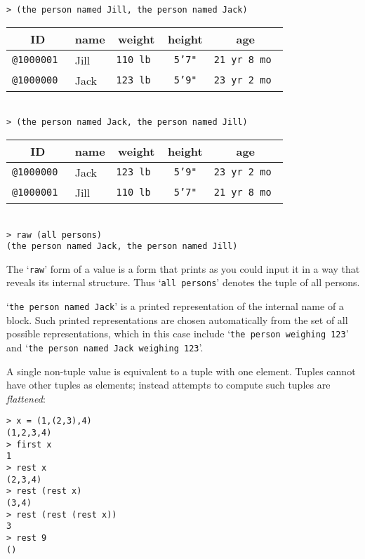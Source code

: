 \documentclass[12pt]{article}
\newcommand{\key}[1]{{\em #1}\index{#1}}
\newenvironment{indpar}[1][0.3in]%
	{\begin{list}{}%
		     {\setlength{\itemsep}{0in}%
		      \setlength{\topsep}{0in}%
		      \setlength{\parsep}{1ex}%
		      \setlength{\labelwidth}{#1}%
		      \setlength{\leftmargin}{#1}%
		      \addtolength{\leftmargin}{\labelsep}}%
	 \item}%
	{\end{list}}
\begin{document}
\begin{indpar}
\verb|> (the person named Jill, the person named Jack)| \\
\begin{tabular}{|r|l|r|r|r|}
\hline
\multicolumn{1}{|c}{\bf ID} &
\multicolumn{1}{|c}{\bf name} &
\multicolumn{1}{|c}{\bf weight} &
\multicolumn{1}{|c}{\bf height} &
\multicolumn{1}{|c|}{\bf age} \\
\hline
\tt @1000001 & Jill & \tt 110 lb & \tt 5'7" & \tt 21 yr 8 mo \\
\tt @1000000 & Jack & \tt 123 lb & \tt 5'9" & \tt 23 yr 2 mo \\
\hline
\end{tabular} \\
\verb|> (the person named Jack, the person named Jill)| \\
\begin{tabular}{|r|l|r|r|r|}
\hline
\multicolumn{1}{|c}{\bf ID} &
\multicolumn{1}{|c}{\bf name} &
\multicolumn{1}{|c}{\bf weight} &
\multicolumn{1}{|c}{\bf height} &
\multicolumn{1}{|c|}{\bf age} \\
\hline
\tt @1000000 & Jack & \tt 123 lb & \tt 5'9" & \tt 23 yr 2 mo \\
\tt @1000001 & Jill & \tt 110 lb & \tt 5'7" & \tt 21 yr 8 mo \\
\hline
\end{tabular} \\
\verb|> raw (all persons)| \\
\verb|(the person named Jack, the person named Jill)|
\end{indpar}

The `{\tt raw}' form of a value is a form that prints as you could
input it in a way that reveals its internal structure.  Thus
`{\tt all persons}' denotes the tuple of all persons.

`{\tt the person named Jack}' is a printed representation of the
internal name of a block.  Such printed representations are chosen
automatically from the set of all possible representations, which
in this case include `{\tt the person weighing 123}' and
`{\tt the person named Jack weighing 123}'.

A single non-tuple value is equivalent to a tuple with one element.
Tuples cannot have other tuples as elements; instead attempts to
compute such tuples are \key{flattened}:

\begin{indpar}
\verb|> x = (1,(2,3),4)| \\
\verb|(1,2,3,4)| \\
\verb|> first x| \\
\verb|1| \\
\verb|> rest x| \\
\verb|(2,3,4)| \\
\verb|> rest (rest x)| \\
\verb|(3,4)| \\
\verb|> rest (rest (rest x))| \\
\verb|3| \\
\verb|> rest 9| \\
\verb|()|
\end{indpar}
\end{document}
